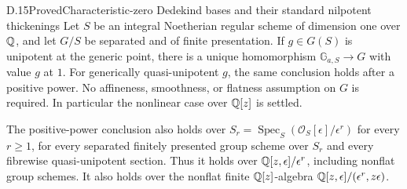 \begin{statement}{D.15}{Proved}{Characteristic-zero Dedekind bases and their standard nilpotent thickenings}
Let $S$ be an integral Noetherian regular scheme of dimension one
over $\mathbb Q$, and let $G/S$ be separated and of finite presentation.
If $g\in G(S)$ is unipotent at the generic point, there is a unique
homomorphism $\mathbb G_{a,S}\to G$ with value $g$ at $1$.
For generically quasi-unipotent $g$, the same conclusion holds after
a positive power. No affineness, smoothness, or flatness assumption
on $G$ is required. In particular the nonlinear case over $\mathbb Q[z]$
is settled.

The positive-power conclusion also holds over
$S_r=\operatorname{Spec}_S(\mathcal O_S[\epsilon]/\epsilon^r)$ for
every $r\ge1$, for every separated finitely presented group scheme
over $S_r$ and every fibrewise quasi-unipotent section. Thus it holds
over $\mathbb Q[z,\epsilon]/\epsilon^r$, including nonflat group schemes.
It also holds over the nonflat finite $\mathbb Q[z]$-algebra
$\mathbb Q[z,\epsilon]/(\epsilon^r,z\epsilon)$.
\end{statement}

